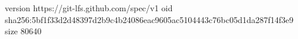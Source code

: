 version https://git-lfs.github.com/spec/v1
oid sha256:5bf1f33d2d48397d2b9c4b24086eac9605ac5104443c76bc05d1da287f14f3e9
size 80640
